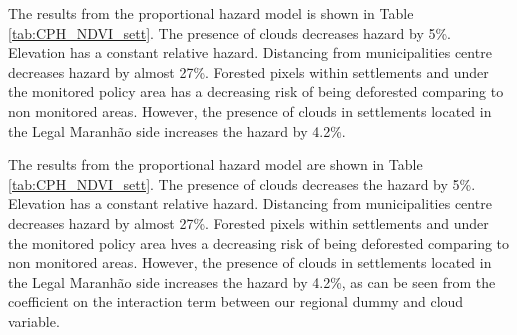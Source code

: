 The results from the proportional hazard model is shown in Table \ref{tab:CPH_NDVI_sett}. The presence of clouds decreases hazard by 5\%. Elevation has a constant relative hazard. Distancing from municipalities centre decreases hazard by almost 27\%. Forested pixels within settlements and under the monitored policy area has a decreasing risk of being deforested comparing to non monitored areas. However, the presence of clouds in settlements located in the Legal Maranhão side increases the hazard by 4.2\%.

The results from the proportional hazard model are shown in Table \ref{tab:CPH_NDVI_sett}. The presence of clouds decreases the hazard by 5\%. Elevation has a constant relative hazard. Distancing from municipalities centre decreases hazard by almost 27\%. Forested pixels within settlements and under the monitored policy area hves a decreasing risk of being deforested comparing to non monitored areas. However, the presence of clouds in settlements located in the Legal Maranhão side increases the hazard by 4.2\%, as can be seen from the coefficient on the interaction term between our regional dummy and cloud variable.

